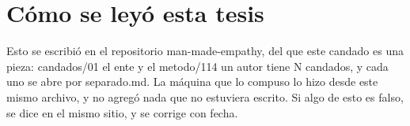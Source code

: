\documentclass[11pt,a4paper]{article}
\begin{document}
\section*{Cómo se leyó esta tesis}
Esto se escribió en el repositorio man-made-empathy, del que este candado es una pieza: candados/01 el ente y el metodo/114 un autor tiene N candados, y cada uno se abre por separado.md. La máquina que lo compuso lo hizo desde este mismo archivo, y no agregó nada que no estuviera escrito. Si algo de esto es falso, se dice en el mismo sitio, y se corrige con fecha.
\end{document}
